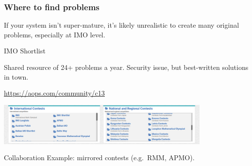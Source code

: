 \documentclass[10pt]{beamer}
\begin{document}
\begin{frame}
  \frametitle{Where to find problems}
  If your system isn't super-mature, it's likely
  unrealistic to create many original problems, especially at IMO level.

  \begin{alertblock}{IMO Shortlist}
    \begin{itemize}
      \ii Shared resource of 24+ problems a year.
      \ii Security issue, but best-written solutions in town.
    \end{itemize}
  \end{alertblock}

  \pause

  \begin{block}{\url{https://aops.com/community/c13}}
    \begin{center}
      \includegraphics[width=0.8\textwidth]{contest-index.png}
    \end{center}
  \end{block}

  \pause

  \begin{exampleblock}{Collaboration}
    Example: mirrored contests (e.g.\ RMM, APMO).
  \end{exampleblock}
\end{frame}
\end{document}
